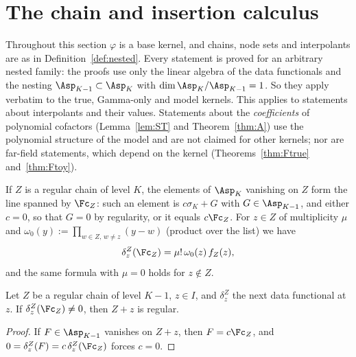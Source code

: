 \section{The chain and insertion calculus}\label{sec:chain}\label{ssec:chain}

Throughout this section $\varphi$ is a base kernel, and chains, node sets and interpolants are as in
Definition~\ref{def:nested}. Every statement is proved for an arbitrary nested family: the proofs use only
the linear algebra of the data functionals and the nesting $\Asp_{K-1}\subset\Asp_K$ with
$\dim\Asp_K/\Asp_{K-1}=1$. So they apply verbatim to the true, Gamma-only and model kernels. This
applies to statements about interpolants and their values. Statements about the \emph{coefficients} of
polynomial cofactors (Lemma~\ref{lem:ST} and Theorem~\ref{thm:A}) use the polynomial structure of the model and
are not claimed for other kernels; nor are far-field statements, which depend on the kernel
(Theorems~\ref{thm:Ftrue} and~\ref{thm:Ftoy}).

If $Z$ is a regular chain of level $K$, the elements of $\Asp_K$ vanishing on $Z$ form the line spanned
by $\Fc_Z$: such an element is $c\sigma_K+G$ with $G\in\Asp_{K-1}$, and either $c=0$, so that $G=0$ by
regularity, or it equals $c\Fc_Z$. For $z\in Z$ of multiplicity $\mu$ and
$\omega_0(y):=\prod_{w\in Z,\,w\ne z}(y-w)$ (product over the list) we have
\begin{equation}\label{eq:chainvalue}
\delta^Z_z(\Fc_Z)=\mu!\,\omega_0(z)\,f_Z(z),
\end{equation}
and the same formula with $\mu=0$ holds for $z\notin Z$.

\begin{lemma}\label{lem:R}
Let $Z$ be a regular chain of level $K-1$, $z\in I$, and $\delta^Z_z$ the next data functional at $z$. If
$\delta^Z_z(\Fc_Z)\ne0$, then $Z+z$ is regular.
\end{lemma}

\begin{proof}
If $F\in\Asp_{K-1}$ vanishes on $Z+z$, then $F=c\Fc_Z$, and $0=\delta^Z_z(F)=c\,\delta^Z_z(\Fc_Z)$ forces $c=0$.
\end{proof}

